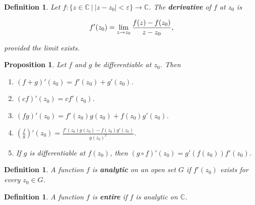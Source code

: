 \documentclass{article}
\theoremstyle{colontheorem}
\newtheorem{proposition}[theorem]{Proposition}
\newtheorem{definition}[theorem]{Definition}
\newenvironment{Proposition}
{
	\begin{mdframed}[backgroundcolor=TheoremOrange!10]
	\begin{proposition}
}
{
	\end{proposition}
	\end{mdframed}
	
	\vspace{.15in}
}
\newenvironment{Def}
{
	\begin{mdframed}[backgroundcolor=DefGreen!10]
	\begin{definition}
}
{
	\end{definition}
	\end{mdframed}
	
	\vspace{.15in}
}
\begin{document}
\begin{Def}
	
	Let $f : \{z \in \mathbb{C}\ |\ |z-z_0| < \varepsilon\} \longrightarrow \mathbb{C}$. The \textbf{derivative} of $f$ at $z_0$ is
	
	$$
		f'(z_0) = \lim\limits_{z \to z_0} \frac{f(z) - f(z_0)}{z - z_0}\textnormal{,}
	$$
	
	provided the limit exists.
	
\end{Def}



\begin{Proposition}
	
	Let $f$ and $g$ be differentiable at $z_0$. Then
	
	\begin{enumerate}
		
		\item $(f+g)'(z_0) = f'(z_0) + g'(z_0)$.
		
		\item $(cf)'(z_0) = cf'(z_0)$.
		
		\item $(fg)'(z_0) = f'(z_0) g(z_0) + f(z_0) g'(z_0)$.
		
		\item $\left( \frac{f}{g} \right)' (z_0) = \frac{f'(z_0) g(z_0) - f(z_0) g'(z_0)}{g(z_0)^2}$.
		
		\item If $g$ is differentiable at $f(z_0)$, then $(g \circ f)'(z_0) = g'(f(z_0)) f'(z_0)$.
				
	\end{enumerate}
	
\end{Proposition}



\begin{Def}
	
	A function $f$ is \textbf{analytic} on an open set $G$ if $f'(z_0)$ exists for every $z_0 \in G$.
	
\end{Def}



\begin{Def}
	
	A function $f$ is \textbf{entire} if $f$ is analytic on $\mathbb{C}$.
	
\end{Def}
\end{document}
